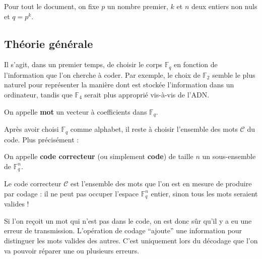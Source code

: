 





  \nocite{[FFN]}
  \nocite{[PEY]}
  \nocite{[BMP]}

  Pour tout le document, on fixe $p$ un nombre premier, $k$ et $n$ deux entiers non nuls et $q = p^k$.

  \subsection{Théorie générale}

  Il s'agit, dans un premier temps, de choisir le corps $\mathbb{F}_q$ en fonction de l'information que l'on cherche à coder. Par exemple, le choix de $\mathbb{F}_2$ semble le plus naturel pour représenter la manière dont est stockée l'information dans un ordinateur, tandis que $\mathbb{F}_4$ serait plus approprié vis-à-vis de l'ADN.

  \begin{definition}
    On appelle \textbf{mot} un vecteur à coefficients dans $\mathbb{F}_q$.
  \end{definition}

  Après avoir choisi $\mathbb{F}_q$ comme alphabet, il reste à choisir l'ensemble des mots $\mathcal{C}$ du code. Plus précisément :

  \begin{definition}
    On appelle \textbf{code correcteur} (ou simplement \textbf{code}) de taille $n$ un sous-ensemble de $\mathbb{F}_q^n$.
  \end{definition}

  \begin{remark}
    Le code correcteur $\mathcal{C}$ est l'ensemble des mots que l'on est en mesure de produire par codage : il ne peut pas occuper l'espace $\mathbb{F}_q^n$ entier, sinon tous les mots seraient valides !
  \end{remark}

  Si l'on reçoit un mot qui n'est pas dans le code, on est donc sûr qu'il y a eu une erreur de transmission. L'opération de codage ``ajoute'' une information pour distinguer les mots valides des autres. C'est uniquement lors du décodage que l'on va pouvoir réparer une ou plusieurs erreurs.

